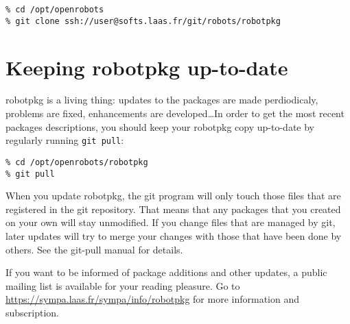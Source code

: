 \begin{verbatim}
% cd /opt/openrobots
% git clone ssh://user@softs.laas.fr/git/robots/robotpkg
\end{verbatim}


\section{Keeping robotpkg up-to-date} %

robotpkg is  a living  thing: updates  to the packages  are made  perdiodicaly,
problems are fixed,  enhancements are developed\ldots  In order to get the most
recent packages descriptions, you should keep your robotpkg copy up-to-date by
regularly running {\tt git pull}:

\begin{verbatim}
% cd /opt/openrobots/robotpkg
% git pull
\end{verbatim}

When you update robotpkg, the git program will only  touch those files that are
registered in the git repository. That means that any packages that you created
on your own will stay unmodified. If you change files that  are managed by git,
later updates will try to merge your changes with  those that have been done by
others. See the git-pull manual for details.

If you want  to be informed  of package additions  and other  updates, a public
mailing    list  is   available    for   your    reading   pleasure.  Go     to
\url{https://sympa.laas.fr/sympa/info/robotpkg}    for   more  information  and
subscription.
